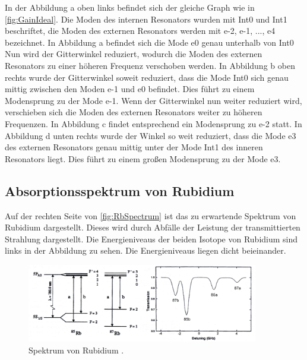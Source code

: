 In der Abbildung a oben links befindet sich der gleiche Graph wie in \autoref{fig:GainIdeal}.
Die Moden des internen Resonators wurden mit Int0 und Int1 beschriftet, die Moden des externen Resonators werden mit e-2, e-1, ..., e4
bezeichnet. In Abbildung a befindet sich die Mode e0 genau unterhalb von Int0
Nun wird der Gitterwinkel reduziert, wodurch die Moden des externen Resonators zu einer höheren Frequenz verschoben werden. 
In Abbildung b oben rechts wurde der Gitterwinkel soweit reduziert, dass die Mode Int0 sich genau mittig zwischen den Moden e-1 und e0 befindet. 
Dies führt zu einem Modensprung zu der Mode e-1. Wenn der Gitterwinkel nun weiter reduziert wird, verschieben sich die Moden des externen Resonators weiter zu 
höheren Frequenzen. In Abbildung c findet entsprechend ein Modensprung zu e-2 statt. In Abbildung d unten rechts wurde der Winkel 
so weit reduziert, dass die Mode e3 des externen Resonators genau mittig unter der Mode Int1 des inneren Resonators liegt. Dies führt 
zu einem großen Modensprung zu der Mode e3.

\subsection{Absorptionsspektrum von Rubidium}
Auf der rechten Seite von \autoref{fig:RbSpectrum} ist das zu erwartende Spektrum von Rubidium dargestellt. Dieses wird durch Abfälle der Leistung
der transmittierten Strahlung dargestellt. Die Energieniveaus der beiden Isotope von Rubidium sind links in der Abbildung zu sehen. Die 
Energieniveaus liegen dicht beieinander.
\begin{figure}
    \centering
    \includegraphics[width=0.9\textwidth]{SpectrumIdeal.png}
    \caption{Spektrum von Rubidium \cite{ap60}.}
    \label{fig:RbSpectrum}
\end{figure}